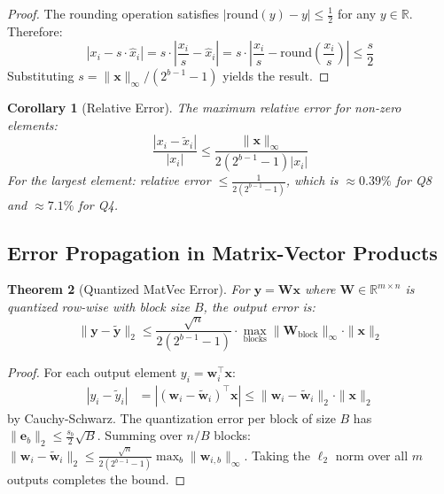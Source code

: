 \documentclass[12pt,a4paper]{article}
\newtheorem{theorem}{Theorem}[section]
\newtheorem{corollary}[theorem]{Corollary}
\begin{document}
\begin{proof}
The rounding operation satisfies $|\text{round}(y) - y| \leq \frac{1}{2}$ for any $y \in \mathbb{R}$. Therefore:
\begin{equation}
|x_i - s \cdot \hat{x}_i| = s \cdot \left|\frac{x_i}{s} - \hat{x}_i\right| = s \cdot \left|\frac{x_i}{s} - \text{round}\left(\frac{x_i}{s}\right)\right| \leq \frac{s}{2}
\end{equation}
Substituting $s = \|\bm{x}\|_\infty / (2^{b-1}-1)$ yields the result.
\end{proof}

\begin{corollary}[Relative Error]
The maximum relative error for non-zero elements:
\begin{equation}
\frac{|x_i - \tilde{x}_i|}{|x_i|} \leq \frac{\|\bm{x}\|_\infty}{2(2^{b-1}-1)|x_i|}
\end{equation}
For the largest element: relative error $\leq \frac{1}{2(2^{b-1}-1)}$, which is $\approx 0.39\%$ for Q8 and $\approx 7.1\%$ for Q4.
\end{corollary}

\subsection{Error Propagation in Matrix-Vector Products}

\begin{theorem}[Quantized MatVec Error]
\label{thm:matvec_error}
For $\bm{y} = \bm{W}\bm{x}$ where $\bm{W} \in \mathbb{R}^{m \times n}$ is quantized row-wise with block size $B$, the output error is:
\begin{equation}
\|\bm{y} - \tilde{\bm{y}}\|_2 \leq \frac{\sqrt{n}}{2(2^{b-1}-1)} \cdot \max_{\text{blocks}} \|\bm{W}_{\text{block}}\|_\infty \cdot \|\bm{x}\|_2
\label{eq:matvec_error}
\end{equation}
\end{theorem}

\begin{proof}
For each output element $y_i = \bm{w}_i^\top \bm{x}$:
\begin{align}
|y_i - \tilde{y}_i| &= |(\bm{w}_i - \tilde{\bm{w}}_i)^\top \bm{x}| \leq \|\bm{w}_i - \tilde{\bm{w}}_i\|_2 \cdot \|\bm{x}\|_2
\end{align}
by Cauchy-Schwarz. The quantization error per block of size $B$ has $\|\bm{e}_b\|_2 \leq \frac{s_b}{2}\sqrt{B}$. Summing over $n/B$ blocks: $\|\bm{w}_i - \tilde{\bm{w}}_i\|_2 \leq \frac{\sqrt{n}}{2(2^{b-1}-1)} \max_b \|\bm{w}_{i,b}\|_\infty$. Taking the $\ell_2$ norm over all $m$ outputs completes the bound.
\end{proof}
\end{document}
